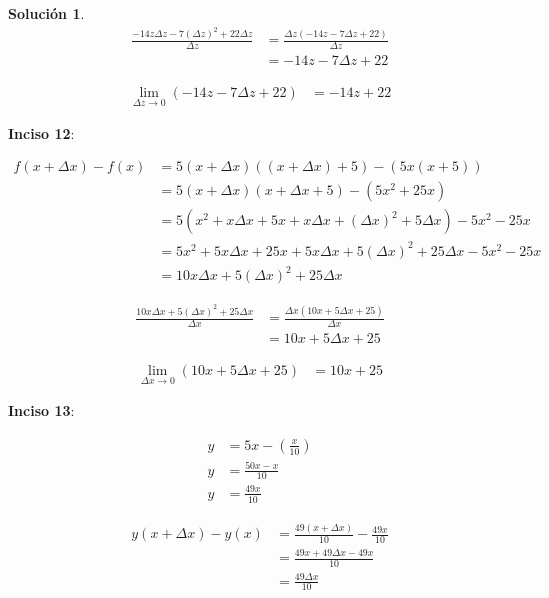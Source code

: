\documentclass{article}
\theoremstyle{definition}
\newtheorem*{solution}{Solución}
\begin{document}
\begin{solution}
    \begin{align*}
        \frac{-14z\Delta z-7(\Delta z)^2+22\Delta z}{\Delta z} &= \frac{\Delta z(-14z-7\Delta z+22)}{\Delta z} \\
        &= -14z-7\Delta z+22
    \end{align*}

    \begin{align*}
        \lim_{\Delta z \to 0} (-14z-7\Delta z+22) &= -14z+22
    \end{align*}

\textbf{Inciso 12}:

    \begin{align*}
        f(x+\Delta x) - f(x) &= 5(x+\Delta x)((x+\Delta x)+5)-(5x(x+5)) \\
        &= 5(x+\Delta x)(x+\Delta x+5)-(5x^2+25x) \\
        &= 5(x^2+x\Delta x+5x+x\Delta x+(\Delta x)^2+5\Delta x)-5x^2-25x \\
        &= 5x^2+5x\Delta x+25x+5x\Delta x+5(\Delta x)^2+25\Delta x-5x^2-25x \\
        &= 10x\Delta x+5(\Delta x)^2+25\Delta x
    \end{align*}

    \begin{align*}
        \frac{10x\Delta x+5(\Delta x)^2+25\Delta x}{\Delta x} &= \frac{\Delta x(10x+5\Delta x+25)}{\Delta x} \\
        &= 10x+5\Delta x+25
    \end{align*}

    \begin{align*}
        \lim_{\Delta x \to 0} (10x+5\Delta x+25) &= 10x+25
    \end{align*}

\textbf{Inciso 13}:

    \begin{align*}
        y &= 5x-(\frac{x}{10}) \\
        y &= \frac{50x-x}{10} \\
        y &= \frac{49x}{10}
    \end{align*}

    \begin{align*}
        y(x+\Delta x)-y(x) &= \frac{49(x+\Delta x)}{10} - \frac{49x}{10} \\
        &= \frac{49x+49\Delta x - 49x}{10} \\
        &= \frac{49\Delta x}{10}
    \end{align*}


\end{solution}
\end{document}
